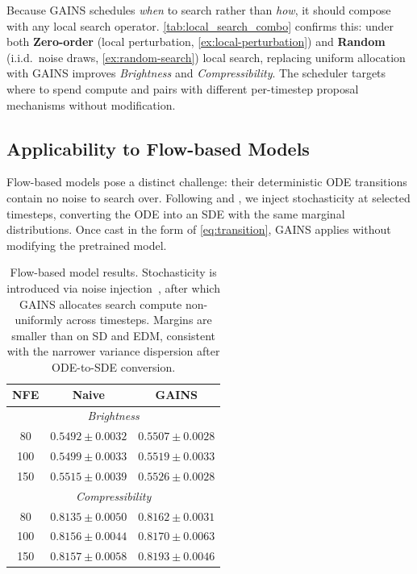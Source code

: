 Because GAINS schedules \emph{when} to search rather than \emph{how}, it should compose with any local search operator.
\cref{tab:local_search_combo} confirms this: under both \textbf{Zero-order} (local perturbation, \cref{ex:local-perturbation}) and \textbf{Random} (i.i.d.\ noise draws, \cref{ex:random-search}) local search, replacing uniform allocation with GAINS improves \textit{Brightness} and \textit{Compressibility}.
The scheduler targets where to spend compute and pairs with different per-timestep proposal mechanisms without modification.

\subsection{Applicability to Flow-based Models}
\label{sec:exp-flow}

Flow-based models pose a distinct challenge: their deterministic ODE transitions
contain no noise to search over.
Following \citet{dockhorn2024stochastic} and \citet{kim2025rbf}, we inject
stochasticity at selected timesteps, converting the ODE into an SDE with the
same marginal distributions.
Once cast in the form of \cref{eq:transition}, GAINS applies without modifying the pretrained model.

\begin{table}[t]
\centering
\caption{Flow-based model results. Stochasticity is introduced via noise
injection~\citep{dockhorn2024stochastic}, after which GAINS
allocates search compute non-uniformly across timesteps.
Margins are smaller than on SD and EDM, consistent with the narrower variance dispersion after ODE-to-SDE conversion.}
\label{tab:flow_results}
\begin{tabular}{c|c|c}
\toprule
\textbf{NFE} & \textbf{Naive} & \textbf{GAINS} \\
\midrule
\multicolumn{3}{c}{\textit{Brightness}} \\
\midrule
80  & $0.5492 \pm 0.0032$ & $\mathbf{0.5507 \pm 0.0028}$ \\
100 & $0.5499 \pm 0.0033$ & $\mathbf{0.5519 \pm 0.0033}$ \\
150 & $0.5515 \pm 0.0039$ & $\mathbf{0.5526 \pm 0.0028}$ \\
\midrule
\multicolumn{3}{c}{\textit{Compressibility}} \\
\midrule
80  & $0.8135 \pm 0.0050$ & $\mathbf{0.8162 \pm 0.0031}$ \\
100 & $0.8156 \pm 0.0044$ & $\mathbf{0.8170 \pm 0.0063}$ \\
150 & $0.8157 \pm 0.0058$ & $\mathbf{0.8193 \pm 0.0046}$ \\
\bottomrule
\end{tabular}
\end{table}

